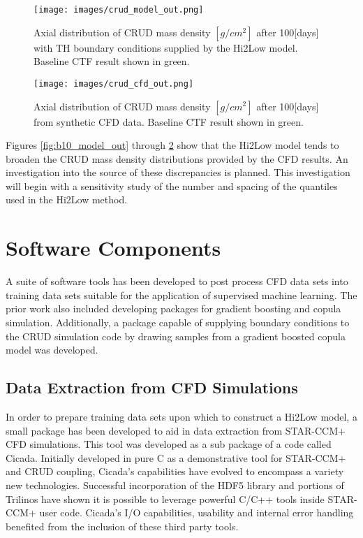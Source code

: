 \begin{figure}[hbtp]
\centering
\texttt{[image: images/crud\_model\_out.png]}
\caption{Axial distribution of CRUD mass density $[g/cm^2]$ after 100[days] with TH boundary conditions supplied by the Hi2Low model. Baseline CTF result shown in green.}
\label{fig:crud_model_out}
\end{figure}

\begin{figure}[hbtp]
\centering
\texttt{[image: images/crud\_cfd\_out.png]}
\caption{Axial distribution of CRUD mass density $[g/cm^2]$ after 100[days] from synthetic CFD data. Baseline CTF result shown in green.}
\label{fig:crud_cfd_out}
\end{figure}

Figures \ref{fig:b10_model_out} through \ref{fig:crud_cfd_out} show that the Hi2Low model tends to broaden the CRUD mass density distributions provided by the CFD results.  An investigation into the source of these discrepancies is planned.  This investigation will begin with a sensitivity study of the number and spacing of the quantiles used in the Hi2Low method.

\section{Software Components}

A suite of software tools has been developed to post process CFD data sets into training data sets suitable for the application of supervised machine learning.   The prior work also included developing packages for gradient boosting and copula simulation.  Additionally, a package capable of supplying boundary conditions to the CRUD simulation code by drawing samples from a gradient boosted copula model was developed.

\subsection{Data Extraction from CFD Simulations}

In order to prepare training data sets upon which to construct a Hi2Low model, a small package has been developed to aid in data extraction from STAR-CCM+ CFD simulations.  This tool was developed as a sub package of a code called Cicada. Initially developed in pure C as a demonstrative tool for STAR-CCM+ and CRUD coupling, Cicada's capabilities have evolved to encompass a variety new technologies.  Successful incorporation of the HDF5 library and portions of Trilinos have shown it is possible to leverage powerful C/C++ tools inside STAR-CCM+ user code.  Cicada's I/O capabilities, usability and internal error handling benefited from the inclusion of these third party tools.

